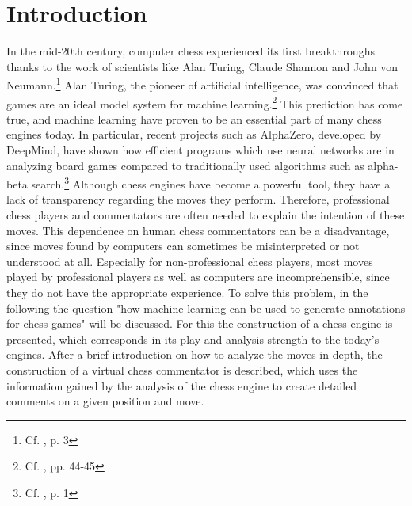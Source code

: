 \section{Introduction}

In the mid-20th century, computer chess experienced its first breakthroughs thanks to the work of scientists like Alan Turing, Claude Shannon and John von Neumann.\footnote{Cf. \cite{keen-2009-history}, p. 3} Alan Turing, the pioneer of artificial intelligence, was convinced that games are an ideal model system for machine learning.\footnote{Cf. \cite{levy-newborn-1982}, pp. 44-45} This prediction has come true, and machine learning have proven to be an essential part of many chess engines today. In particular, recent projects such as AlphaZero, developed by DeepMind, have shown how efficient programs which use neural networks are in analyzing board games compared to traditionally used algorithms such as alpha-beta search.\footnote{Cf. \cite{alphazero-2018}, p. 1} Although chess engines have become a powerful tool, they have a lack of transparency regarding the moves they perform. Therefore, professional chess players and commentators are often needed to explain the intention of these moves. This dependence on human chess commentators can be a disadvantage, since moves found by computers can sometimes be misinterpreted or not understood at all. Especially for non-professional chess players, most moves played by professional players as well as computers are incomprehensible, since they do not have the appropriate experience. To solve this problem, in the following the question "how machine learning can be used to generate annotations for chess games" will be discussed. For this the construction of a chess engine is presented, which corresponds in its play and analysis strength to the today's engines. After a brief introduction on how to analyze the moves in depth, the construction of a virtual chess commentator is described, which uses the information gained by the analysis of the chess engine to create detailed comments on a given position and move.